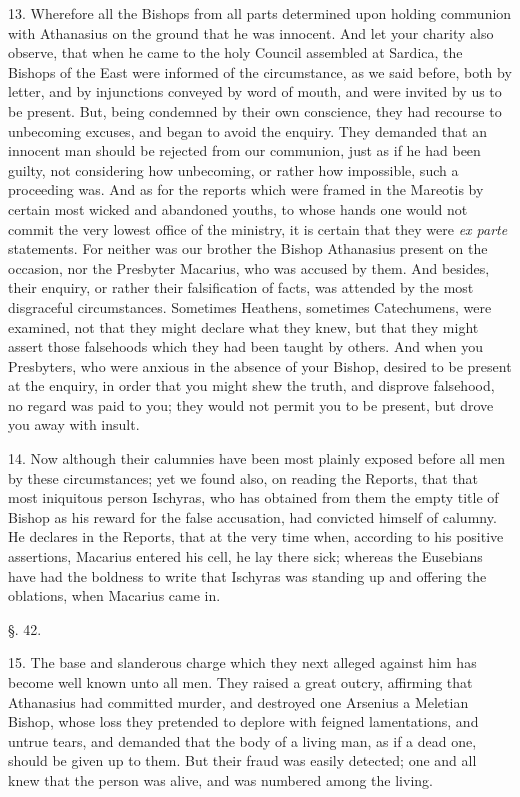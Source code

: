 13. Wherefore all the Bishops from all parts
determined upon holding communion with Athanasius on the ground that
he was innocent. And let your charity also observe, that when he came
to the holy Council assembled at Sardica, the Bishops of the East were
informed of the circumstance, as we said before, both by letter, and
by injunctions conveyed by word of mouth, and were invited by us to be
present. But, being condemned by their own conscience, they had
recourse to unbecoming excuses, and began to avoid the enquiry. They
demanded that an innocent man should be rejected from our communion,
just as if he had been guilty, not considering how unbecoming, or
rather how impossible, such a proceeding was. And as for the reports
which were framed in the Mareotis by certain most wicked and abandoned
youths, to whose hands one would not commit the very lowest office of
the ministry, it is certain that they were \emph{ex parte} statements.
For neither was our brother the Bishop Athanasius present on the
occasion, nor the Presbyter Macarius, who was accused by them. And
besides, their enquiry, or rather their falsification of facts, was
attended by the most disgraceful circumstances. Sometimes Heathens,
sometimes Catechumens, were examined, not that they might declare what
they knew, but that they might assert those falsehoods which they had
been taught by others. And when you Presbyters, who were anxious in
the absence of your Bishop, desired to be present at the enquiry, in
order that you might shew the truth, and disprove falsehood, no regard
was paid to you; they would not permit you to be present, but drove
you away with insult.

14. Now although their calumnies have been most
plainly exposed before all men by these circumstances; yet we found also, on reading the Reports, that that most iniquitous person
Ischyras, who has obtained from them the empty title of Bishop as his
reward for the false accusation, had convicted himself of calumny. He
declares in the Reports, that at the very time when, according to his
positive assertions, Macarius entered his cell, he lay there sick;
whereas the Eusebians have had the boldness to write that Ischyras was
standing up and offering the oblations, when Macarius came in.

§. 42.

15. The base and slanderous charge which they
next alleged against him has become well known unto all men. They
raised a great outcry, affirming that Athanasius had committed murder,
and destroyed one Arsenius a Meletian Bishop, whose loss they
pretended to deplore with feigned lamentations, and untrue tears, and
demanded that the body of a living man, as if a dead one, should be
given up to them. But their fraud was easily detected; one and all
knew that the person was alive, and was numbered among the living.

